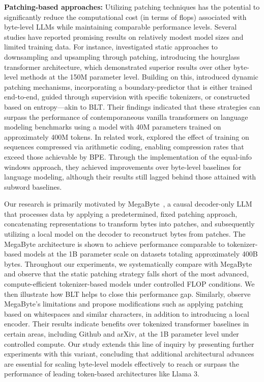 \textbf{Patching-based approaches:} Utilizing patching techniques has the potential to significantly reduce the computational cost (in terms of flops) associated with byte-level LLMs while maintaining comparable performance levels. Several studies have reported promising results on relatively modest model sizes and limited training data. For instance, \cite{nawrot-etal-2022-hierarchical} investigated static approaches to downsampling and upsampling through patching, introducing the hourglass transformer architecture, which demonstrated superior results over other byte-level methods at the 150M parameter level. Building on this, \cite{nawrot-etal-2023-efficient} introduced dynamic patching mechanisms, incorporating a boundary-predictor that is either trained end-to-end, guided through supervision with specific tokenizers, or constructed based on entropy—akin to {\textsc BLT}. Their findings indicated that these strategies can surpass the performance of contemporaneous vanilla transformers on language modeling benchmarks using a model with 40M parameters trained on approximately 400M tokens. In related work, \cite{lester2024training} explored the effect of training on sequences compressed via arithmetic coding, enabling compression rates that exceed those achievable by BPE. Through the implementation of the equal-info windows approach, they achieved improvements over byte-level baselines for language modeling, although their results still lagged behind those attained with subword baselines.

Our research is primarily motivated by MegaByte~\citep{yu2023megabyte}, a causal decoder-only LLM that processes data by applying a predetermined, fixed patching approach, concatenating representations to transform bytes into patches, and subsequently utilizing a local model on the decoder to reconstruct bytes from patches. The MegaByte architecture is shown to achieve performance comparable to tokenizer-based models at the 1B parameter scale on datasets totaling approximately 400B bytes. Throughout our experiments, we systematically compare with MegaByte and observe that the static patching strategy falls short of the most advanced, compute-efficient tokenizer-based models under controlled FLOP conditions. We then illustrate how {\textsc BLT} helps to close this performance gap. Similarly, \cite{slagle2024spacebyte} observe MegaByte's limitations and propose modifications such as applying patching based on whitespaces and similar characters, in addition to introducing a local encoder. Their results indicate benefits over tokenized transformer baselines in certain areas, including Github and arXiv, at the 1B parameter level under controlled compute. Our study extends this line of inquiry by presenting further experiments with this variant, concluding that additional architectural advances are essential for scaling byte-level models effectively to reach or surpass the performance of leading token-based architectures like Llama 3.

